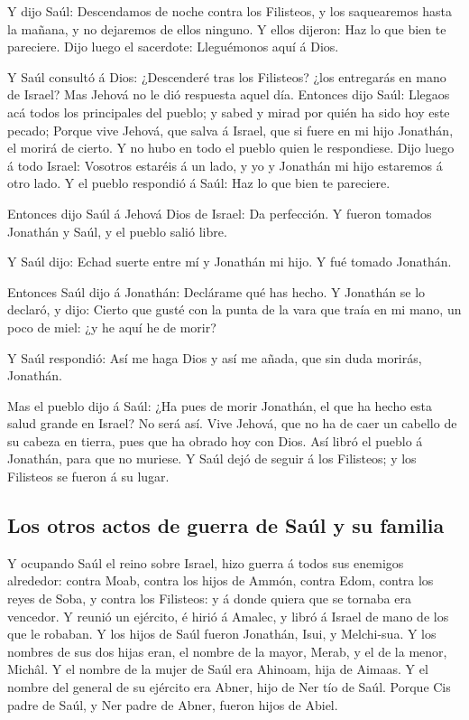  Y dijo Saúl: Descendamos de noche contra los Filisteos, y
los saquearemos hasta la mañana, y no dejaremos de ellos ninguno. Y
ellos dijeron: Haz lo que bien te pareciere. Dijo luego el sacerdote:
Lleguémonos aquí á Dios.

 Y Saúl consultó á Dios: ¿Descenderé tras los Filisteos?
¿los entregarás en mano de Israel? Mas Jehová no le dió respuesta aquel
día.  Entonces dijo Saúl: Llegaos acá todos los principales
del pueblo; y sabed y mirad por quién ha sido hoy este pecado;
 Porque vive Jehová, que salva á Israel, que si fuere en mi
hijo Jonathán, el morirá de cierto. Y no hubo en todo el pueblo quien le
respondiese.  Dijo luego á todo Israel: Vosotros estaréis á
un lado, y yo y Jonathán mi hijo estaremos á otro lado. Y el pueblo
respondió á Saúl: Haz lo que bien te pareciere.

 Entonces dijo Saúl á Jehová Dios de Israel: Da perfección.
Y fueron tomados Jonathán y Saúl, y el pueblo salió libre.

 Y Saúl dijo: Echad suerte entre mí y Jonathán mi hijo. Y
fué tomado Jonathán.

 Entonces Saúl dijo á Jonathán: Declárame qué has hecho. Y
Jonathán se lo declaró, y dijo: Cierto que gusté con la punta de la vara
que traía en mi mano, un poco de miel: ¿y he aquí he de morir?

 Y Saúl respondió: Así me haga Dios y así me añada, que sin
duda morirás, Jonathán.

 Mas el pueblo dijo á Saúl: ¿Ha pues de morir Jonathán, el
que ha hecho esta salud grande en Israel? No será así. Vive Jehová, que
no ha de caer un cabello de su cabeza en tierra, pues que ha obrado hoy
con Dios. Así libró el pueblo á Jonathán, para que no muriese.
 Y Saúl dejó de seguir á los Filisteos; y los Filisteos se
fueron á su lugar.

\hypertarget{los-otros-actos-de-guerra-de-sauxfal-y-su-familia}{%
\subsection{Los otros actos de guerra de Saúl y su
familia}\label{los-otros-actos-de-guerra-de-sauxfal-y-su-familia}}

 Y ocupando Saúl el reino sobre Israel, hizo guerra á todos
sus enemigos alrededor: contra Moab, contra los hijos de Ammón, contra
Edom, contra los reyes de Soba, y contra los Filisteos: y á donde quiera
que se tornaba era vencedor.  Y reunió un ejército, é hirió
á Amalec, y libró á Israel de mano de los que le robaban. 
Y los hijos de Saúl fueron Jonathán, Isui, y Melchi-sua. Y los nombres
de sus dos hijas eran, el nombre de la mayor, Merab, y el de la menor,
Michâl.  Y el nombre de la mujer de Saúl era Ahinoam, hija
de Aimaas. Y el nombre del general de su ejército era Abner, hijo de Ner
tío de Saúl.  Porque Cis padre de Saúl, y Ner padre de
Abner, fueron hijos de Abiel.

